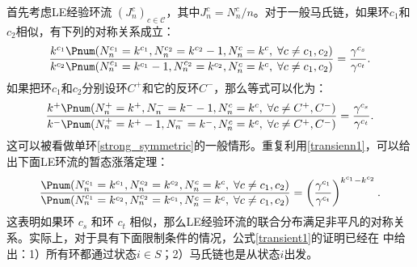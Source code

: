 首先考虑LE经验环流 $(J^c_n)_{c\in\mathcal{C}}$，其中$J_n^c=N_n^c/n$。对于一般马氏链，如果环$c_1$和$c_2$相似，有下列的对称关系成立：
\begin{equation}\label{transient1}
    \frac{k^{c_1} \Pnum(N^{c_1}_n=k^{c_1},N^{c_2}_n=k^{c_2}-1,N^{c}_n=k^{c},\;\forall c\neq c_1,c_2)}
    {k^{c_2} \Pnum(N^{c_1}_n=k^{c_1} -1,N^{c_2}_n=k^{c_2},N^{c}_n=k^{c},\;\forall c\neq c_1,c_2)}
    = \frac{\gamma^{c_s}}{\gamma^{c_t}}.
\end{equation}
如果把环$c_1$和$c_2$分别设环$C^+$和它的反环$C^-$，那么等式可以化为：
\begin{equation*}
    \frac{k^{+} \Pnum(N^{+}_n=k^{+},N^{-}_n=k^{-}-1,N^{c}_n=k^{c},\;\forall c\neq C^+,C^-)}
    {k^{-} \Pnum(N^{+}_n=k^{+} -1,N^{-}_n=k^{-},N^{c}_n=k^{c},\;\forall c\neq C^+,C^-)}
    = \frac{\gamma^{c_s}}{\gamma^{c_t}}.
\end{equation*}
这可以被看做单环\ref{strong_symmetric}的一般情形。重复利用\ref{transienn1}，可以给出下面LE环流的暂态涨落定理：
\begin{equation}\label{transient2}
    \frac{\Pnum(N^{c_1}_n=k^{c_1},N^{c_2}_n=k^{c_2},N^{c}_n=k^{c},\;\forall c\neq c_1,c_2)}
    {\Pnum(N^{c_1}_n=k^{c_2},N^{c_2}_n=k^{c_1},N^{c}_n=k^{c},\;\forall c\neq c_1,c_2)}
    = \left(\frac{\gamma^{c_1}}{\gamma^{c_t}}\right)^{k^{c_1}-k^{c_2}}.
\end{equation}
这表明如果环 $c_s$ 和环 $c_t$ 相似，那么LE经验环流的联合分布满足非平凡的对称关系。实际上，对于具有下面限制条件的情况，公式\ref{transient1}的证明已经在 \cite{jia2016cycle}中给出：1）所有环都通过状态$i\in S$；2）马氏链也是从状态$i$出发。

